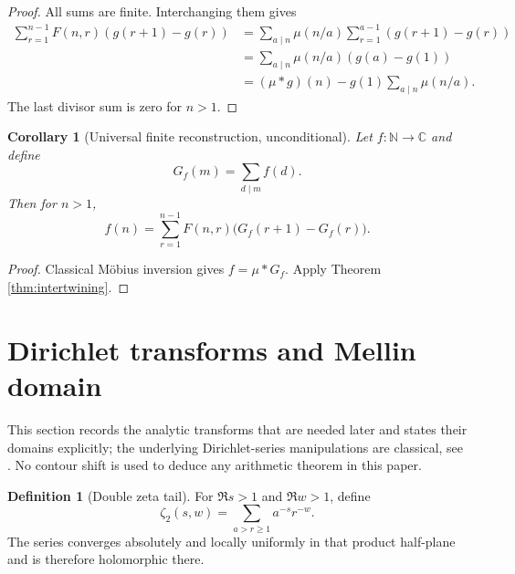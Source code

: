 \documentclass[11pt]{amsart}
\numberwithin{equation}{section}
\theoremstyle{plain}
\newtheorem{corollary}[theorem]{Corollary}
\theoremstyle{definition}
\newtheorem{definition}[theorem]{Definition}
\theoremstyle{remark}
\newcommand{\N}{\mathbb N}
\newcommand{\C}{\mathbb C}
\newcommand{\mob}{\mu}
\newcommand{\Fsurf}{F}
\begin{document}
\begin{proof}
All sums are finite.  Interchanging them gives
\begin{align}
\sum_{r=1}^{n-1}\Fsurf(n,r)(g(r+1)-g(r))
&=\sum_{a\mid n}\mob(n/a)\sum_{r=1}^{a-1}(g(r+1)-g(r))
\label{eq:intertwining_swap}\\
&=\sum_{a\mid n}\mob(n/a)(g(a)-g(1))
\label{eq:intertwining_telescope}\\
&=(\mob*g)(n)-g(1)\sum_{a\mid n}\mob(n/a).
\label{eq:intertwining_last}
\end{align}
The last divisor sum is zero for $n>1$.
\end{proof}

\begin{corollary}[Universal finite reconstruction, unconditional]
\label{cor:universal_reconstruction}
Let $f:\N\to\C$ and define
\begin{equation}
G_f(m)=\sum_{d\mid m}f(d).
\label{eq:Gf_definition}
\end{equation}
Then for $n>1$,
\begin{equation}
f(n)=\sum_{r=1}^{n-1}\Fsurf(n,r)\bigl(G_f(r+1)-G_f(r)\bigr).
\label{eq:universal_reconstruction}
\end{equation}
\end{corollary}

\begin{proof}
Classical Möbius inversion gives $f=\mob*G_f$.  Apply Theorem \ref{thm:intertwining}.
\end{proof}

\section{Dirichlet transforms and Mellin domain}
\label{sec:analytic_transforms}

This section records the analytic transforms that are needed later and states their domains explicitly; the underlying Dirichlet-series manipulations are classical, see \cite{Apostol1976}.  No contour shift is used to deduce any arithmetic theorem in this paper.

\begin{definition}[Double zeta tail]
\label{def:zeta2}
For $\Re s>1$ and $\Re w>1$, define
\begin{equation}
\zeta_2(s,w)=\sum_{a>r\ge1}a^{-s}r^{-w}.
\label{eq:zeta2_definition}
\end{equation}
The series converges absolutely and locally uniformly in that product half-plane and is therefore holomorphic there.
\end{definition}
\end{document}
